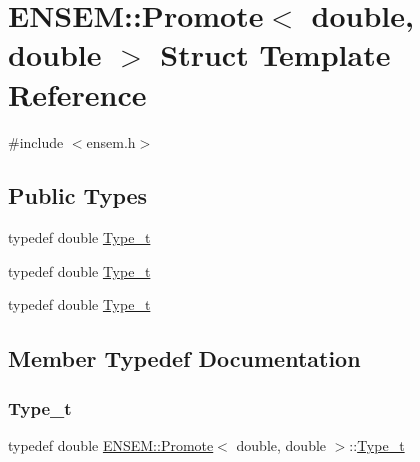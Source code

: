 \hypertarget{structENSEM_1_1Promote_3_01double_00_01double_01_4}{}\section{E\+N\+S\+EM\+:\+:Promote$<$ double, double $>$ Struct Template Reference}
\label{structENSEM_1_1Promote_3_01double_00_01double_01_4}


{\ttfamily \#include $<$ensem.\+h$>$}

\subsection*{Public Types}
\begin{DoxyCompactItemize}
\item 
typedef double \mbox{\hyperlink{structENSEM_1_1Promote_3_01double_00_01double_01_4_a24ebc4a5bef63c7bb489c2cf17b184ab}{Type\+\_\+t}}
\item 
typedef double \mbox{\hyperlink{structENSEM_1_1Promote_3_01double_00_01double_01_4_a24ebc4a5bef63c7bb489c2cf17b184ab}{Type\+\_\+t}}
\item 
typedef double \mbox{\hyperlink{structENSEM_1_1Promote_3_01double_00_01double_01_4_a24ebc4a5bef63c7bb489c2cf17b184ab}{Type\+\_\+t}}
\end{DoxyCompactItemize}


\subsection{Member Typedef Documentation}
\mbox{\label{structENSEM_1_1Promote_3_01double_00_01double_01_4_a24ebc4a5bef63c7bb489c2cf17b184ab}} 
\subsubsection{\texorpdfstring{Type\_t}{Type\_t}\hspace{0.1cm}{\footnotesize\ttfamily [1/3]}}
{\footnotesize\ttfamily typedef double \mbox{\hyperlink{structENSEM_1_1Promote}{E\+N\+S\+E\+M\+::\+Promote}}$<$ double, double $>$\+::\mbox{\hyperlink{structENSEM_1_1Promote_3_01double_00_01double_01_4_a24ebc4a5bef63c7bb489c2cf17b184ab}{Type\+\_\+t}}}

